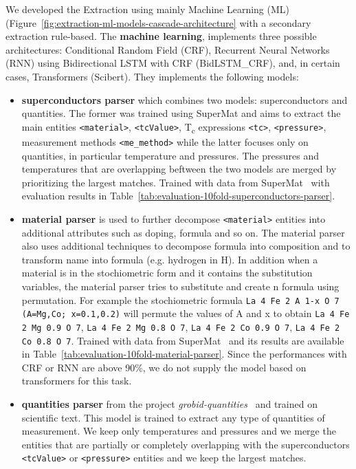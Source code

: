 \documentclass{article}
\begin{document}
We developed the Extraction using mainly Machine Learning (ML) (Figure~\ref{fig:extraction-ml-models-cascade-architecture} with a secondary extraction rule-based.
The \textbf{machine learning}, implements three possible architectures: Conditional Random Field (CRF), Recurrent Neural Networks (RNN) using Bidirectional LSTM with CRF (BidLSTM\_CRF), and, in certain cases, Transformers (Scibert). They implements the following models: 
\begin{itemize}
    \item \textbf{superconductors parser} which combines two models: superconductors and quantities. The former was trained using SuperMat and aims to extract the main entities \texttt{<material>}, \texttt{<tcValue>}, T\textsubscript{c} expressions \texttt{<tc>}, \texttt{<pressure>}, measurement methods \texttt{<me\_method>} while the latter focuses only on quantities, in particular temperature and pressures. The pressures and temperatures that are overlapping beftween the two models are merged by prioritizing the largest matches. Trained with data from SuperMat~\cite{foppiano2021supermat} with evaluation results in Table~\ref{tab:evaluation-10fold-superconductors-parser}.
    \item \textbf{material parser} is used to further decompose \texttt{<material>} entities into additional attributes such as doping, formula and so on. The material parser also uses additional techniques to decompose formula into composition and to transform name into formula (e.g. hydrogen in H). In addition when a material is in the stochiometric form and it contains the substitution variables, the material parser tries to substitute and create n formula using permutation. For example the stochiometric formula \texttt{La 4 Fe 2 A 1-x O 7 (A=Mg,Co; x=0.1,0.2)} will permute the values of A and x to obtain \texttt{La 4 Fe 2 Mg 0.9 O 7}, \texttt{La 4 Fe 2 Mg 0.8 O 7}, \texttt{La 4 Fe 2 Co 0.9 O 7}, \texttt{La 4 Fe 2 Co 0.8 O 7}. Trained with data from SuperMat~\cite{foppiano2021supermat} and its results are available in Table~\ref{tab:evaluation-10fold-material-parser}. Since the performances with CRF or RNN are above 90\%, we do not supply the model based on transformers for this task. 
    \item \textbf{quantities parser} from the project \textit{grobid-quantities}~\cite{foppiano2019quantities} and trained on scientific text. This model is trained to extract any type of quantities of measurement. We keep only temperatures and pressures and we merge the entities that are partially or completely overlapping with the superconductors \texttt{<tcValue>} or \texttt{<pressure>} entities and we keep the largest matches. 
\end{itemize}
\end{document}
